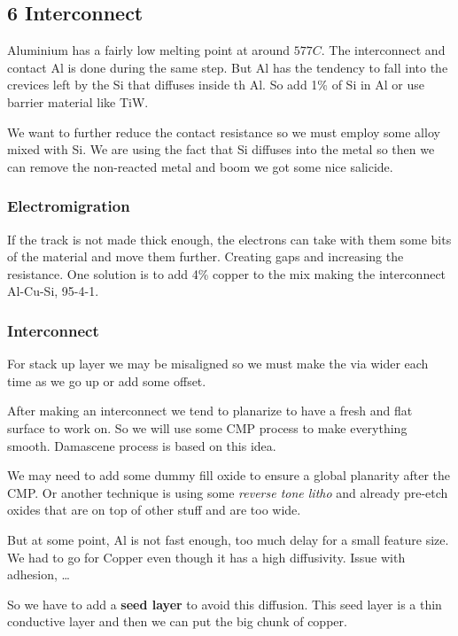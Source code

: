 \documentclass[
]{article}
\begin{document}
\subsection{6 Interconnect}\label{interconnect}

Aluminium has a fairly low melting point at around \(577 C\). The
interconnect and contact Al is done during the same step. But Al has the
tendency to fall into the crevices left by the Si that diffuses inside
th Al. So add 1\% of Si in Al or use barrier material like TiW.

We want to further reduce the contact resistance so we must employ some
alloy mixed with Si. We are using the fact that Si diffuses into the
metal so then we can remove the non-reacted metal and boom we got some
nice salicide.

\subsubsection{Electromigration}\label{electromigration}

If the track is not made thick enough, the electrons can take with them
some bits of the material and move them further. Creating gaps and
increasing the resistance. One solution is to add 4\% copper to the mix
making the interconnect Al-Cu-Si, 95-4-1.

\subsubsection{Interconnect}\label{interconnect-1}

For stack up layer we may be misaligned so we must make the via wider
each time as we go up or add some offset.

After making an interconnect we tend to planarize to have a fresh and
flat surface to work on. So we will use some CMP process to make
everything smooth. Damascene process is based on this idea.

We may need to add some dummy fill oxide to ensure a global planarity
after the CMP. Or another technique is using some \emph{reverse tone
litho} and already pre-etch oxides that are on top of other stuff and
are too wide.

But at some point, Al is not fast enough, too much delay for a small
feature size. We had to go for Copper even though it has a high
diffusivity. Issue with adhesion, \ldots{}

So we have to add a \textbf{seed layer} to avoid this diffusion. This
seed layer is a thin conductive layer and then we can put the big chunk
of copper.
\end{document}

